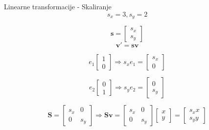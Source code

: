 \documentclass[9pt]{beamer}
\begin{document}
\begin{frame}{Linearne transformacije  - Skaliranje}
	$$s_{x} =3, s_{y} = 2$$
	
		\begin{equation}
		\mathbf{s} =  \left[ \begin{array}{c} s_{x} \\ s_{y}  \end{array} \right]
		\nonumber
		\end{equation}
	$$\mathbf{v}' = \mathbf{s}\mathbf{v}$$
	
		\begin{equation}
		e_{1} \left[ \begin{array}{c} 1 \\ 0  \end{array} \right] \Rightarrow
		s_{x}e_{1} = \left[ \begin{array}{c} s_{x} \\ 0  \end{array} \right] 
		\nonumber
		\end{equation}
	
	
		\begin{equation}
		e_{2} \left[ \begin{array}{c} 0 \\ 1  \end{array} \right] \Rightarrow
		s_{y}e_{2} = \left[ \begin{array}{c} 0 \\ s_{y}  \end{array} \right] 
		\nonumber
		\end{equation}
	
	
		\begin{equation}
		\mathbf{S} =  \left[ \begin{array}{cc} s_{x} & 0 \\ 0 & s_{y}  \end{array} \right] \Rightarrow
		\mathbf{S}\mathbf{v} = \left[ \begin{array}{cc} s_{x} & 0 \\ 0 & s_{y}  \end{array} \right]
		\left[ \begin{array}{c} x \\ y  \end{array} \right] = 
		\left[ \begin{array}{c} s_{x}x \\ s_{y}y  \end{array} \right] 
		\nonumber
		\end{equation}
\end{frame}
\end{document}
